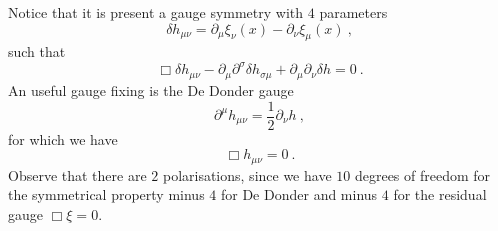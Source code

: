     Notice that it is present a gauge symmetry with $4$ parameters 
    \begin{equation*}
        \delta h_{\mu\nu} = \partial_\mu \xi_\nu (x) - \partial_\nu \xi_\mu (x) ~,
    \end{equation*}
    such that 
    \begin{equation*}
        \Box \delta h_{\mu\nu} - \partial_\mu \partial^\sigma \delta h_{\sigma \mu} + \partial_\mu \partial_\nu \delta h = 0 ~.
    \end{equation*}
    An useful gauge fixing is the De Donder gauge 
    \begin{equation*}
        \partial^\mu h_{\mu\nu} = \frac{1}{2} \partial_\nu h ~,
    \end{equation*}
    for which we have 
    \begin{equation*}
        \Box h_{\mu\nu} = 0 ~.
    \end{equation*}
    Observe that there are $2$ polarisations, since we have $10$ degrees of freedom for the symmetrical property minus $4$ for De Donder and minus $4$ for the residual gauge $\Box \xi = 0$.
    